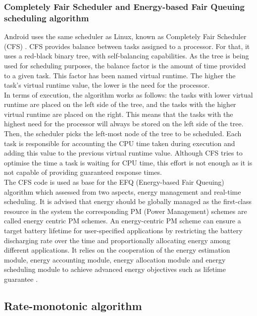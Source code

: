 \documentclass[conference]{IEEEtran}
\begin{document}
\subsubsection{Completely Fair Scheduler and Energy-based Fair Queuing scheduling algorithm}

Android uses the same scheduler as Linux, known as Completely Fair Scheduler (CFS) \cite{ANDR01}. CFS provides balance between tasks assigned to a processor. For that, it uses a red-black binary tree,  with self-balancing capabilities.  As the tree is being used for scheduling purposes, the balance factor is the amount of time provided to a given task. This factor has been named virtual runtime. The higher the task’s virtual runtime value, the lower is the need for the processor.\\
In terms of execution, the algorithm works as follows: the tasks with lower virtual runtime are placed on the left side of the tree, and the tasks with the higher virtual runtime are placed on the right. This means that the tasks with the highest need for the processor will always be  stored on the left side of the tree. Then, the scheduler picks the left-most node of the tree to be scheduled. Each task is responsible for accounting the CPU time taken during execution and adding this value to the previous virtual runtime value. Although CFS tries to optimise the time a task is waiting for CPU time, this effort is not enough as it is not capable of providing guaranteed response times. \\
The CFS code is used as base for the EFQ (Energy-based Fair Queuing) algorithm which assessed from two aspects, energy management and real-time scheduling. 
It is advised that energy should be globally managed as the first-class resource in the system  the corresponding PM (Power Management) schemes are called energy centric PM schemes. An energy-centric PM scheme can ensure a target battery lifetime for user-specified applications by restricting the battery discharging rate over the time and proportionally allocating energy among different applications.  It relies on the cooperation of the energy estimation module, energy accounting module, energy allocation module and energy scheduling module to achieve advanced energy objectives such as lifetime guarantee \cite{WEI01}.

\subsection{Rate-monotonic algorithm}
\end{document}
